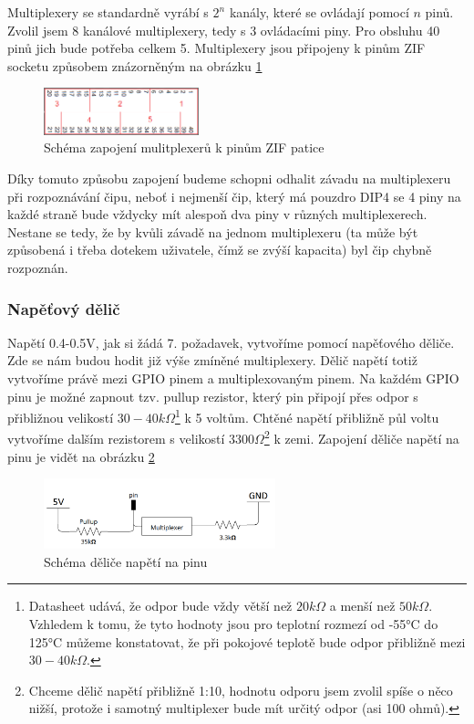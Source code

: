 \documentclass[11pt,a4paper,twoside,openright]{report}
\begin{document}
Multiplexery se standardně vyrábí s $2^n$ kanály, které se ovládají pomocí $n$ pinů. Zvolil jsem 8 kanálové multiplexery\cite{multiplexer}, tedy s 3 ovládacími piny. Pro obsluhu 40 pinů jich bude potřeba celkem 5. Multiplexery jsou připojeny k pinům ZIF socketu způsobem znázorněným na obrázku \ref{fig:mux_diagram}

\begin{figure}[ht!]
  \includegraphics[width=0.4\textwidth]{img/mux_diagram.png}
  \centering
  \caption{Schéma zapojení mulitplexerů k pinům ZIF patice}
  \label{fig:mux_diagram}
\end{figure}

Díky tomuto způsobu zapojení budeme schopni odhalit závadu na multiplexeru při rozpoznávání čipu, neboť i nejmenší čip, který má pouzdro DIP4 se 4 piny na každé straně bude vždycky mít alespoň dva piny v různých multiplexerech. Nestane se tedy, že by kvůli závadě na jednom multiplexeru (ta může být způsobená i třeba dotekem uživatele, čímž se zvýší kapacita) byl čip chybně rozpoznán.

\subsubsection {Napěťový dělič}

Napětí 0.4-0.5V, jak si žádá 7. požadavek, vytvoříme pomocí napěťového děliče. Zde se nám budou hodit již výše zmíněné multiplexery. Dělič napětí totiž vytvoříme právě mezi GPIO pinem a multiplexovaným pinem. Na každém GPIO pinu je možné zapnout tzv. pullup rezistor, který pin připojí přes odpor s přibližnou velikostí $30-40k\Omega$\footnote{Datasheet udává, že odpor bude vždy větší než $20k\Omega$ a menší než $50k\Omega$. Vzhledem k tomu, že tyto hodnoty jsou pro teplotní rozmezí od -55°C do 125°C můžeme konstatovat, že při pokojové teplotě bude odpor přibližně mezi $30-40k\Omega$.} k 5 voltům. Chtěné napětí přibližně půl voltu vytvoříme dalším rezistorem s velikostí $3300\Omega$\footnote{Chceme dělič napětí přibližně 1:10, hodnotu odporu jsem zvolil spíše o něco nižší, protože i samotný multiplexer bude mít určitý odpor (asi 100 ohmů).} k zemi. Zapojení děliče napětí na pinu je vidět na obrázku \ref{fig:voltage_divider}


\begin{figure}[ht!]
  \includegraphics[width=0.6\textwidth]{img/voltage_divider.png}
  \centering
  \caption{Schéma děliče napětí na pinu}
  \label{fig:voltage_divider}
\end{figure}
\end{document}
